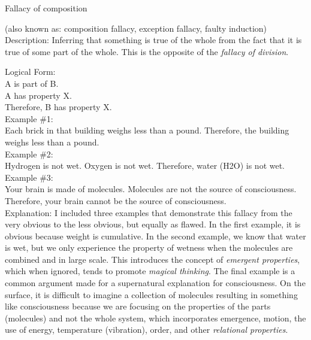 \documentclass[a4paper,12pt,single,pdftex]{scrbook}
\begin{document}
Fallacy of composition
    
      (also known as: composition fallacy, exception fallacy, faulty induction)
    \\

  
    Description: Inferring that something is true of the whole from the fact that it is true of some part of the whole.  This is the opposite of the {\it fallacy of division}.

    
      Logical Form:
    \\

    
      A is part of B.
    \\

    
      A has property X.
    \\

    
      Therefore, B has property X.
    \\

    
      Example \#1:
    \\

    
      Each brick in that building weighs less than a pound.  Therefore, the building weighs less than a pound.
    \\

    
      Example \#2:
    \\

    
      Hydrogen is not wet.  Oxygen is not wet.  Therefore, water (H2O) is not wet.
    \\

    
      Example \#3:
    \\

    
      Your brain is made of molecules.  Molecules are not the source of consciousness.  Therefore, your brain cannot be the source of consciousness.
    \\

    
      Explanation: I included three examples that demonstrate this fallacy from the very obvious to the less obvious, but equally as flawed.  In the first example, it is obvious because weight is cumulative.  In the second example, we know that water is wet, but we only experience the property of wetness when the molecules are combined and in large scale.  This introduces the concept of {\it emergent properties}, which when ignored, tends to promote {\it magical thinking}.  The final example is a common argument made for a supernatural explanation for consciousness.  On the surface, it is difficult to imagine a collection of molecules resulting in something like consciousness because we are focusing on the properties of the parts (molecules) and not the whole system, which incorporates emergence, motion, the use of energy, temperature (vibration), order, and other {\it relational properties}.
    \\
\end{document}
